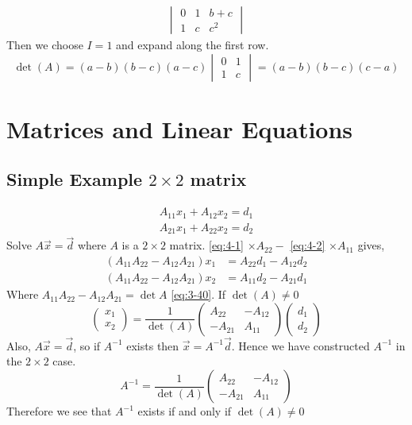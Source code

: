 \documentclass{article}
\numberwithin{equation}{section}
\begin{document}
\begin{eg}
\begin{enumerate}
\begin{align*}
\begin{vmatrix}
                0 & 1 & b + c \\
                1 & c & c^2
            \end{vmatrix} \tag{factor}
        \end{align*}
        Then we choose $I = 1$ and expand along the first row.
        \[
            \det(A) = (a - b)(b - c)(a - c) \begin{vmatrix}
                0 & 1 \\
                1 & c
            \end{vmatrix} = (a - b)(b - c)(c - a)
        \]
    \end{enumerate}
\end{eg}

\section{Matrices and Linear Equations}
\subsection{Simple Example $2 \times 2$ matrix}
\begin{align}
    A_{11}x_1 + A_{12}x_2 = d_1 \label{eq:4-1} \\
    A_{21}x_1 + A_{22}x_2 = d_2 \label{eq:4-2}
\end{align}
Solve $A \vec x = \vec d$ where $A$ is a $2 \times 2$ matrix. \eqref{eq:4-1} $\times A_{22} -$ \eqref{eq:4-2} $\times A_{11}$ gives, 
\begin{align*}
    (A_{11}A_{22} - A_{12}A_{21}) x_1 &= A_{22}d_1 - A_{12}d_2 \\
    (A_{11}A_{22} - A_{12}A_{21}) x_2 &= A_{11}d_2 - A_{21}d_1
\end{align*}
Where $A_{11}A_{22} - A_{12}A_{21} = \det A$ \eqref{eq:3-40}.
If $\det(A) \neq 0$
\[
    \begin{pmatrix}
        x_1 \\ x_2
    \end{pmatrix}
    = \frac{1}{\det(A)}
    \begin{pmatrix}
        A_{22} & -A_{12} \\
        -A_{21} & A_{11}
    \end{pmatrix}
    \begin{pmatrix}
        d_1 \\ d_2
    \end{pmatrix}
\]
Also, $A \vec x = \vec d$, so if $A^{-1}$ exists then $\vec x = A^{-1} \vec d$.
Hence we have constructed $A^{-1}$ in the $2 \times 2$ case.
\begin{equation}
    A^{-1} = \frac{1}{\det(A)}
    \begin{pmatrix}
        A_{22} & -A_{12} \\
        -A_{21} & A_{11}
    \end{pmatrix}
\end{equation}
Therefore we see that $A^{-1}$ exists if and only if $\det(A) \neq 0$
\end{document}

